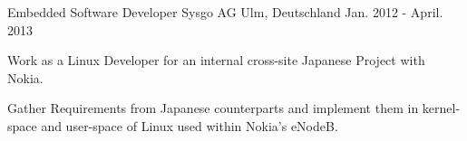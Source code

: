   \cventry
    {Embedded Software Developer} %
    {Sysgo AG} %
    {Ulm, Deutschland} %
    {Jan. 2012 - April. 2013} %
    {
      \begin{cvitems} %
    \item {Work as a Linux Developer for an internal cross-site Japanese Project with Nokia.}
	\item {Gather Requirements from Japanese counterparts and implement them in kernel-space and user-space of Linux used within Nokia's eNodeB.}
       \end{cvitems}
    }
